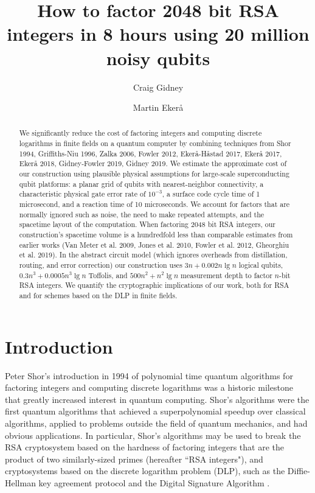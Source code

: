 \documentclass[a4paper, onecolumn, accepted=2021-03-29]{quantumarticle}
\begin{document}
\title{How to factor 2048 bit RSA integers in 8 hours using 20 million noisy qubits}

\author{Craig Gidney}
\author{Martin Ekerå}

\begin{abstract}
We significantly reduce the cost of factoring integers and computing discrete logarithms in finite fields on a quantum computer by combining techniques from Shor 1994, Griffiths-Niu 1996, Zalka 2006, Fowler 2012, Ekerå-Håstad 2017, Ekerå 2017, Ekerå 2018, Gidney-Fowler 2019, Gidney 2019.
We estimate the approximate cost of our construction using plausible physical assumptions for large-scale superconducting qubit platforms:
 a planar grid of qubits with nearest-neighbor connectivity,
 a characteristic physical gate error rate of $10^{-3}$,
 a surface code cycle time of 1 microsecond,
 and a reaction time of 10 microseconds.
We account for factors that are normally ignored such as noise, the need to make repeated attempts, and the spacetime layout of the computation.
When factoring 2048 bit RSA integers, our construction's spacetime volume is a hundredfold less than comparable estimates from earlier works (Van Meter et al. 2009, Jones et al. 2010, Fowler et al. 2012, Gheorghiu et al. 2019).
In the abstract circuit model (which ignores overheads from distillation, routing, and error correction) our construction uses $3 n + 0.002 n \lg n$ logical qubits, $0.3 n^3 + 0.0005 n^3 \lg n$ Toffolis, and $500 n^2 + n^2 \lg n$ measurement depth to factor $n$-bit RSA integers.
We quantify the cryptographic implications of our work, both for RSA and for schemes based on the DLP in finite fields.
\end{abstract}

\maketitle

\section{Introduction}
\label{sec:introduction}
Peter Shor's introduction in 1994 of polynomial time quantum algorithms for factoring integers and computing discrete logarithms \cite{shor1994,Timeline} was a historic milestone that greatly increased interest in quantum computing.
Shor's algorithms were the first quantum algorithms that achieved a superpolynomial speedup over classical algorithms, applied to problems outside the field of quantum mechanics, and had obvious applications.
In particular, Shor's algorithms may be used to break the RSA cryptosystem \cite{rsa} based on the hardness of factoring integers that are the product of two similarly-sized primes (hereafter ``RSA integers"), and cryptosystems based on the discrete logarithm problem (DLP), such as the Diffie-Hellman key agreement protocol \cite{diffie-hellman} and the Digital Signature Algorithm \cite{fips-186-4}.
\end{document}
